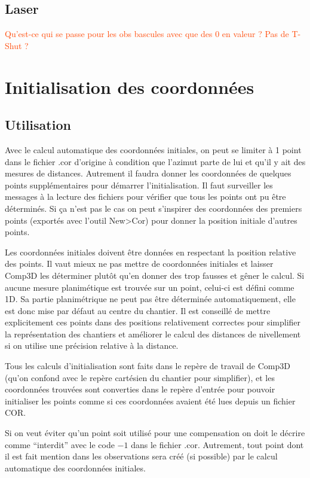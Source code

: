 \documentclass[french]{report}
\newcommand{\revoir}[1]{\textcolor{OrangeRed}{#1}}
\begin{document}
\section{Laser}
\revoir{Qu'est-ce qui se passe pour les obs bascules avec que des 0 en valeur ? Pas de T-Shut ?}



\chapter{Initialisation des coordonnées}
\section{Utilisation}
Avec le calcul automatique des coordonnées initiales, on peut se limiter à 1 point dans le fichier .cor d'origine à condition
que l'azimut parte de lui et qu'il y ait des mesures de distances. Autrement il faudra donner les coordonnées de quelques
points supplémentaires pour démarrer l'initialisation. Il faut surveiller les messages à la lecture des fichiers pour vérifier
que tous les points ont pu être déterminés. Si ça n'est pas le cas on peut s'inspirer des coordonnées des premiers points
(exportés avec l'outil New>Cor) pour donner la position initiale d'autres points.

Les coordonnées initiales doivent être données en respectant la position relative des points. Il vaut mieux ne pas mettre
de coordonnées initiales et laisser Comp3D les déterminer plutôt qu'en donner des trop fausses et gêner le calcul.
Si aucune mesure planimétique est trouvée sur un point, celui-ci est défini comme 1D. Sa partie planimétrique ne peut pas être déterminée automatiquement,
elle est donc mise par défaut au centre du chantier.
Il est conseillé de mettre explicitement ces points dans des positions relativement correctes pour simplifier la représentation des chantiers
et améliorer le calcul des distances de nivellement si on utilise une précision relative à la distance.

Tous les calculs d'initialisation sont faits dans le repère de travail de Comp3D (qu'on confond avec le repère cartésien du chantier pour simplifier),
et les coordonnées trouvées sont converties dans le repère d'entrée pour pouvoir initialiser les points comme si ces coordonnées avaient été lues depuis un fichier COR.

Si on veut éviter qu'un point soit utilisé pour une compensation on doit le décrire comme ``interdit'' avec le code $-1$ dans le fichier .cor.
Autrement, tout point dont il est fait mention dans les observations sera créé (si possible) par le calcul automatique des coordonnées initiales.
\end{document}
